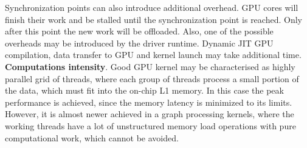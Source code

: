 Synchronization points can also introduce additional overhead. GPU cores will finish their work and be stalled until the synchronization point is reached. Only after this point the new work will be offloaded. Also, one of the possible overheads may be introduced by the driver runtime. Dynamic JIT GPU compilation, data transfer to GPU and kernel launch may take additional time.\\

\textbf{Computations intensity}. Good GPU kernel may be characterised as highly parallel grid of threads, where each group of threads process a small portion of the data, which must fit into the on-chip L1 memory. In this case the peak performance is achieved, since the memory latency is minimized to its limits. However, it is almost newer achieved in a graph processing kernels, where the working threads have a lot of unstructured memory load operations with pure computational work, which cannot be avoided.\\
